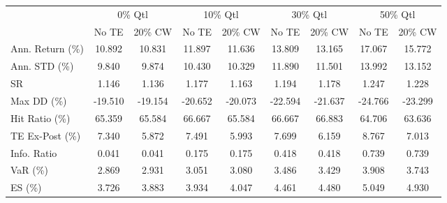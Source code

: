\begin{tabular}{lcccccccc}
\toprule
{} & \multicolumn{2}{c}{0\% Qtl} & \multicolumn{2}{c}{10\% Qtl} & \multicolumn{2}{c}{30\% Qtl} & \multicolumn{2}{c}{50\% Qtl} \\
{} &   No TE &  20\% CW &   No TE &  20\% CW &   No TE &  20\% CW &   No TE &  20\% CW \\
\midrule
Ann. Return (\%) &  10.892 &  10.831 &  11.897 &  11.636 &  13.809 &  13.165 &  17.067 &  15.772 \\
Ann. STD (\%)    &   9.840 &   9.874 &  10.430 &  10.329 &  11.890 &  11.501 &  13.992 &  13.152 \\
SR              &   1.146 &   1.136 &   1.177 &   1.163 &   1.194 &   1.178 &   1.247 &   1.228 \\
Max DD (\%)      & -19.510 & -19.154 & -20.652 & -20.073 & -22.594 & -21.637 & -24.766 & -23.299 \\
Hit Ratio (\%)   &  65.359 &  65.584 &  66.667 &  65.584 &  66.667 &  66.883 &  64.706 &  63.636 \\
TE Ex-Post (\%)  &   7.340 &   5.872 &   7.491 &   5.993 &   7.699 &   6.159 &   8.767 &   7.013 \\
Info. Ratio     &   0.041 &   0.041 &   0.175 &   0.175 &   0.418 &   0.418 &   0.739 &   0.739 \\
VaR (\%)         &   2.869 &   2.931 &   3.051 &   3.080 &   3.486 &   3.429 &   3.908 &   3.743 \\
ES (\%)          &   3.726 &   3.883 &   3.934 &   4.047 &   4.461 &   4.480 &   5.049 &   4.930 \\
\bottomrule
\end{tabular}
